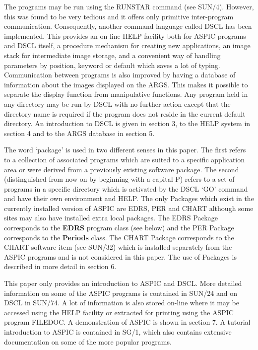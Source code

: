 The programs may be run using the RUNSTAR command (see SUN/4).
However, this was found to be very tedious and it offers only primitive
inter-program communication.
Consequently, another command language called DSCL has been implemented.
This provides an on-line HELP facility both for ASPIC programs and DSCL itself,
a procedure mechanism for creating new applications, an image stack for
intermediate image storage, and a convenient way of handling parameters by
position, keyword or default which saves a lot of typing.
Communication between programs is also improved by having a database of
information about the images displayed on the ARGS.
This makes it possible to separate the display function from manipulative
functions.
Any program held in any directory may be run by DSCL with no further action
except that the directory name is required if the program does not reside in
the current default directory.
An introduction to DSCL is given in section 3, to the HELP system in section 4
and to the ARGS database in section 5.

The word `package' is used in two different senses in this paper.
The first refers to a collection of associated programs which are suited to
a specific application area or were derived from a previously existing software
package.
The second (distinguished from now on by beginning with a capital P) refers to
a set of programs in a specific directory which is activated by the
DSCL `GO' command and have their own environment and HELP.
The only Packages which exist in the currently installed version of ASPIC are
EDRS, PER and CHART although some sites may also have installed extra local
packages.
The EDRS Package corresponds to the {\bf EDRS} program class (see below) and
the PER Package corresponds to the {\bf Periods} class.
The CHART Package corresponds to the CHART software item (see SUN/32) which
is installed separately from the ASPIC programs and is not considered in this
paper.
The use of Packages is described in more detail in section 6.

This paper only provides an introduction to ASPIC and DSCL.
More detailed information on some of the ASPIC programs is contained in SUN/24 
and on DSCL in SUN/74.
A lot of information is also stored on-line where it may be accessed using the
HELP facility or extracted for printing using the ASPIC program FILEDOC.
A demonstration of ASPIC is shown in section 7.
A tutorial introduction to ASPIC is contained in SG/1, which also contains
extensive documentation on some of the more popular programs.

